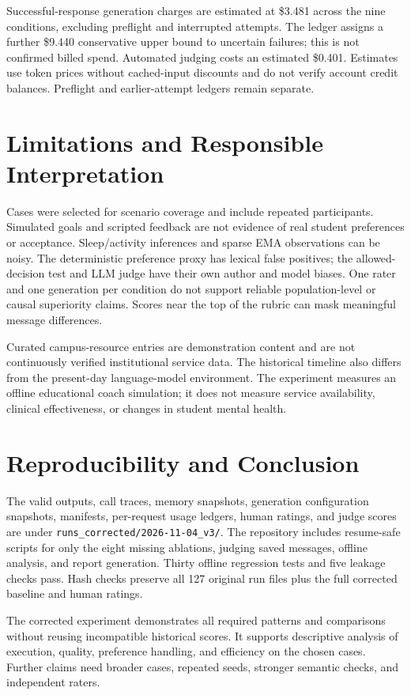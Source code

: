 \documentclass{article}
\begin{document}
Successful-response generation charges are estimated at \$3.481 across the nine conditions, excluding preflight and interrupted attempts. The ledger assigns a further \$9.440 conservative upper bound to uncertain failures; this is not confirmed billed spend. Automated judging costs an estimated \$0.401. Estimates use token prices without cached-input discounts and do not verify account credit balances. Preflight and earlier-attempt ledgers remain separate.

\section{Limitations and Responsible Interpretation}
Cases were selected for scenario coverage and include repeated participants. Simulated goals and scripted feedback are not evidence of real student preferences or acceptance. Sleep/activity inferences and sparse EMA observations can be noisy. The deterministic preference proxy has lexical false positives; the allowed-decision test and LLM judge have their own author and model biases. One rater and one generation per condition do not support reliable population-level or causal superiority claims. Scores near the top of the rubric can mask meaningful message differences.

Curated campus-resource entries are demonstration content and are not continuously verified institutional service data. The historical timeline also differs from the present-day language-model environment. The experiment measures an offline educational coach simulation; it does not measure service availability, clinical effectiveness, or changes in student mental health.

\section{Reproducibility and Conclusion}
The valid outputs, call traces, memory snapshots, generation configuration snapshots, manifests, per-request usage ledgers, human ratings, and judge scores are under \texttt{runs\_corrected/2026-11-04\_v3/}. The repository includes resume-safe scripts for only the eight missing ablations, judging saved messages, offline analysis, and report generation. Thirty offline regression tests and five leakage checks pass. Hash checks preserve all 127 original run files plus the full corrected baseline and human ratings.

The corrected experiment demonstrates all required patterns and comparisons without reusing incompatible historical scores. It supports descriptive analysis of execution, quality, preference handling, and efficiency on the chosen cases. Further claims need broader cases, repeated seeds, stronger semantic checks, and independent raters.
\end{document}

